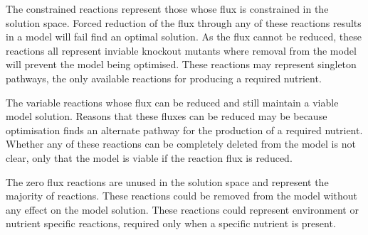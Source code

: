The constrained reactions represent those whose flux is constrained in the solution space. Forced reduction of the flux through any of these reactions results in a model will fail find an optimal solution. As the flux cannot be reduced, these reactions all represent inviable knockout mutants where removal from the model will prevent the model being optimised. These reactions may represent singleton pathways, the only available reactions for producing a required nutrient.

The variable reactions whose flux can be reduced and still maintain a viable model solution. Reasons that these fluxes can be reduced may be because optimisation finds an alternate pathway for the production of a required nutrient. Whether any of these reactions can be completely deleted from the model is not clear, only that the model is viable if the reaction flux is reduced.

The zero flux reactions are unused in the solution space and represent the majority of reactions. These reactions could be removed from the model without any effect on the model solution. These reactions could represent environment or nutrient specific reactions, required only when a specific nutrient is present.

